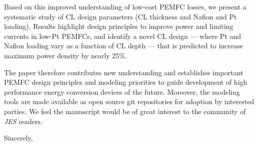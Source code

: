 \documentclass{letter} %
\begin{document}
\begin{letter}{ }
Based on this improved understanding of low-cost PEMFC losses, we present a systematic study of CL design parameters (CL thickness and Nafion and Pt loading). Results highlight design principles to improve power and limiting currents in low-Pt PEMFCs, and identify a novel CL design — where Pt and Nafion loading vary as a function of CL depth — that is predicted to increase maximum power density by nearly 25\%.

The paper therefore contributes new understanding and establishes important PEMFC design principles and modeling priorities to guide development of high performance energy conversion devices of the future. Moreover, the modeling tools are made available as open source git repositories for adoption by interested parties. We feel the manuscript would be of great interest to the community of \emph{JES} readers.

\closing{Sincerely,\\[-0.5mm]
\\[1mm]

} 










\end{letter}
 
\end{document}
